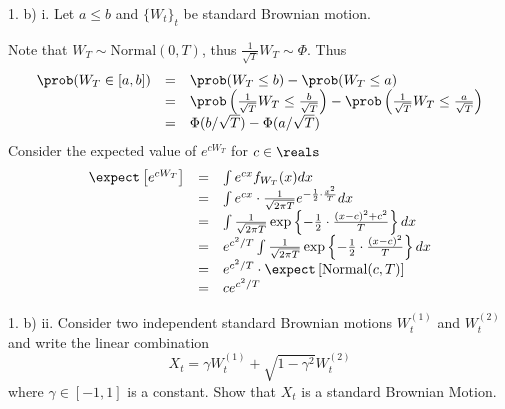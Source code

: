 \documentclass[11pt,a4paper]{article}
\begin{document}
\begin{answer}{1. b) i.}
  Let $a\leq b$ and $\{W_t\}_t$ be standard Brownian motion.
  \par Note that $W_T\sim\text{Normal}(0,T)$, thus $\frac1{\sqrt{T}}W_T\sim\Phi$.
  Thus
  \[\begin{array}{rcl}
    \prob(W_T\in[a,b])&=&\prob(W_T\leq b)-\prob(W_T\leq a)\\
    &=&\prob\left(\frac1{\sqrt{T}}W_T\leq\frac{b}{\sqrt{T}}\right)-\prob\left(\frac1{\sqrt{T}}W_T\leq\frac{a}{\sqrt{T}}\right)\\
    &=&\Phi(b/\sqrt{T})-\Phi(a/\sqrt{T})
  \end{array}\]
  Consider the expected value of $e^{cW_T}$ for $c\in\reals$
  \[\begin{array}{rcl}
    \expect\left[e^{cW_T}\right]&=&\int e^{cx}f_{W_T}(x)dx\\
    &=&\int e^{cx}\cdot\frac1{\sqrt{2\pi T}}e^{-\frac12\cdot\frac{x^2}T}dx\\
    &=&\int\frac1{\sqrt{2\pi T}}\exp\left\{-\frac12\cdot\frac{(x-c)^2+c^2}T\right\}dx\\
    &=&e^{c^2/T}\int\frac1{\sqrt{2\pi T}}\exp\left\{-\frac12\cdot\frac{(x-c)^2}T\right\}dx\\
    &=&e^{c^2/T}\cdot\expect\left[\text{Normal}(c,T)\right]\\
    &=&ce^{c^2/T}
  \end{array}\]
\end{answer}

\begin{question}{1. b) ii.}
  Consider two independent standard Brownian motions $W_t^{(1)}$ and $W_t^{(2)}$ and write the linear combination
  \[ X_t=\gamma W_t^{(1)}+\sqrt{1-\gamma^2}W_t^{(2)} \]
   where $\gamma\in[-1,1]$ is a constant. Show that $X_t$ is a standard Brownian Motion.
\end{question}
\end{document}

